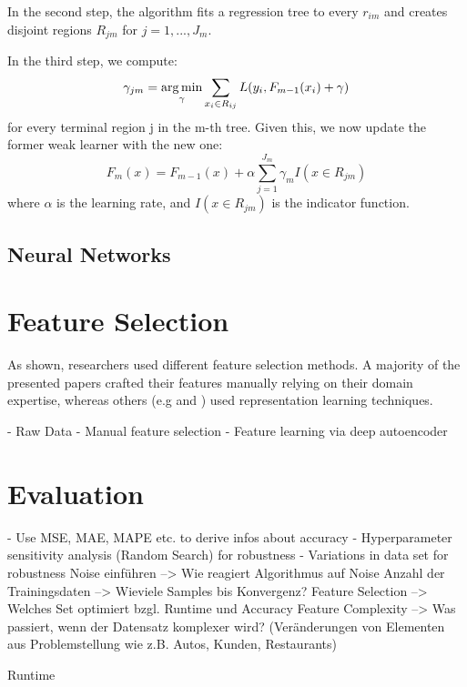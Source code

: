 In the second step, the algorithm fits a regression tree to every $ r_{im} $ and creates disjoint regions $ R_{jm} $ for $j = 1, ..., J_m$. 

In the third step, we compute: 
\begin{equation}
	\gamma_{jm} = \operatorname*{arg\,min}_{\gamma} \sum_{x_i \in R_{ij}} L(y_i, F_{m-1}(x_i) + \gamma)
\end{equation}
for every terminal region j in the m-th tree. 
Given this, we now update the former weak learner with the new one:
\begin{equation}
	F_m(x) = F_{m-1}(x) + \alpha \sum_{j=1}^{J_m} \gamma_{m}I(x \in R_{jm})
\end{equation}
where $ \alpha $ is the learning rate, and $ I(x \in R_{jm}) $ is the indicator function.

\subsection{Neural Networks}

\section{Feature Selection}

As shown, researchers used different feature selection methods. A majority of the presented papers crafted their features manually relying on their domain expertise, whereas others (e.g \cite{Siripanpornchana2016_AnnWithDbnFS} and \cite{Huang2018_GBDT}) used representation learning techniques.


- Raw Data 
- Manual feature selection
- Feature learning via deep autoencoder

\section{Evaluation} 
- Use MSE, MAE, MAPE etc. to derive infos about accuracy
- Hyperparameter sensitivity analysis (Random Search) for robustness
- Variations in data set for robustness
Noise einführen 
--> Wie reagiert Algorithmus auf Noise
Anzahl der Trainingsdaten 
--> Wieviele Samples bis Konvergenz?
Feature Selection
--> Welches Set optimiert bzgl. Runtime und Accuracy
Feature Complexity
--> Was passiert, wenn der Datensatz komplexer wird? (Veränderungen von Elementen aus Problemstellung wie z.B. Autos, Kunden, Restaurants)

Runtime